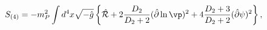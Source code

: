 \begin{equation}
    S_{(4)}= - m_P^2 \int d^4 x \sqrt{-\hat g}
    \left\{ \hat{\cal R}
        + 2{D_2\over D_2+2} (\hat\partial  \ln\vp)^2
        + 4{D_2+3\over D_2+2} (\hat\partial \psi)^2
    \right\},
    \label{einsteinframe}
\end{equation}

